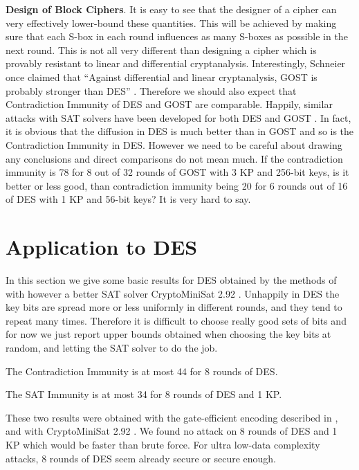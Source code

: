 \noindent
{\bf Design of Block Ciphers}.
It is easy to see
that the designer of a cipher
can very effectively lower-bound
these quantities.
This will be achieved by making sure
that each S-box in each round
influences as many S-boxes as possible in the next round.
This is not all very different than designing a cipher
which is provably resistant to linear and differential cryptanalysis.
Interestingly,
Schneier once claimed that ``Against differential and linear cryptanalysis, GOST is probably stronger than DES''
\cite{schneier2007applied}.
Therefore we should also expect that Contradiction Immunity
of DES and GOST are comparable.
Happily, similar attacks with SAT solvers have been developed
for both DES \cite{DEScourtois} and GOST \cite{OptimiPaper}.
In fact, it is obvious that the diffusion in DES
is much better than in GOST and so is the Contradiction Immunity in DES.
However we need to be careful about drawing any conclusions
and direct comparisons do not mean much.
If the contradiction immunity is 78 for 8 out of 32 rounds of GOST with 3 KP and 256-bit keys,
is it better or less good,
than contradiction immunity
being 20 for 6 rounds out of 16 of DES with 1 KP and 56-bit keys?
It is very hard to say.

\section{Application to DES}

In this section we give some basic results for DES
obtained by the methods
of \cite{DEScourtois}
with however a better SAT solver
CryptoMiniSat 2.92 \cite{CryptoMiniSat}.
Unhappily in DES the key bits are spread more
or less uniformly in different rounds, and they tend to repeat many times.
Therefore it is difficult to choose really good sets of bits
and for now we just report upper bounds obtained when choosing
the key bits at random, and letting the SAT solver to do the job.

\begin{fact}
	\label{ContrImmDES6Rounds}
	The Contradiction Immunity
	is at most 44 for 8 rounds of DES.
\end{fact}

\begin{fact}
	\label{SATImmDES6Rounds}
	The SAT Immunity
	is at most 34 for 8 rounds of DES and 1 KP.
\end{fact}

These two results were obtained with the gate-efficient encoding described in \cite{DEScourtois}, and with CryptoMiniSat 2.92 \cite{CryptoMiniSat}. We found no attack on 8 rounds of DES and 1 KP which would be faster than brute force. For ultra low-data complexity attacks, 8 rounds of DES seem already secure or secure enough.

